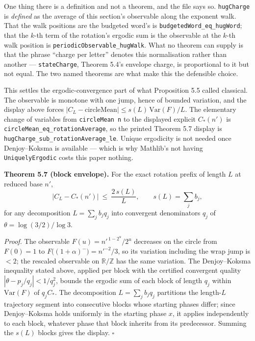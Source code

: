 \documentclass[12pt]{article}
\begin{document}
One thing there is a definition and not a theorem, and the file says so.
\texttt{\nolinkurl{hugCharge}} is \emph{defined} as the average of this
section's observable along the exponent walk. That the walk positions
are the budgeted word's is \texttt{\nolinkurl{budgetedWord_eq_hugWord}};
that the \(k\)-th term of the rotation's ergodic sum is the observable
at the \(k\)-th walk position is
\texttt{\nolinkurl{periodicObservable_hugWalk}}. What no theorem can
supply is that the phrase ``charge per letter'' denotes this
normalisation rather than another --- \texttt{\nolinkurl{stateCharge}},
Theorem 5.4's envelope charge, is proportional to it but not equal. The
two named theorems are what make this the defensible choice.

This settles the ergodic-convergence part of what Proposition 5.5 called
classical. The observable is monotone with one jump, hence of bounded
variation, and the display above forces
\(|C_L-\mathrm{circleMean}|\le s(L)\,\mathrm{Var}(F)/L\). The elementary
change of variables from \texttt{circleMean\ n\textquotesingle{}} to the
displayed explicit \(C_*(n')\) is
\texttt{\nolinkurl{circleMean_eq_rotationAverage}}, so the printed
Theorem 5.7 display is
\texttt{\nolinkurl{hugCharge_sub_rotationAverage_le}}. Unique ergodicity
is not needed once Denjoy--Koksma is available --- which is why
Mathlib's not having \texttt{\nolinkurl{UniquelyErgodic}} costs this
paper nothing.

\textbf{Theorem 5.7 (block envelope).} For the exact rotation prefix of
length \(L\) at reduced base \(n'\), \[
\bigl|C_L-C_*(n')\bigr|\ \le\ \frac{2\,s(L)}{L},
\qquad
s(L)=\sum_j b_j,
\] for any decomposition \(L=\sum_j b_jq_j\) into convergent
denominators \(q_j\) of \(\theta=\log(3/2)/\log 3\).

\emph{Proof.} The observable \(F(u)=n'^{\,1-2^u}/2^u\) decreases on the
circle from \(F(0)=1\) to \(F\bigl((1+\alpha)^-\bigr)
=n'^{-2}/3\), so its variation including the wrap jump is \(<2\); the
rescaled observable on \(\mathbb R/\mathbb Z\) has the same variation.
The Denjoy--Koksma inequality stated above, applied per block with the
certified convergent quality \(|\theta-p_j/q_j|<1/q_j^2\), bounds the
ergodic sum of each block of length \(q_j\) within \(\mathrm{Var}(F)\)
of \(q_jC_*\). The decomposition \(L=\sum_jb_jq_j\) partitions the
length-\(L\) trajectory segment into consecutive blocks whose starting
phases differ; since Denjoy--Koksma holds uniformly in the starting
phase \(x\), it applies independently to each block, whatever phase that
block inherits from its predecessor. Summing the \(s(L)\) blocks gives
the display. \(\square\)
\end{document}
